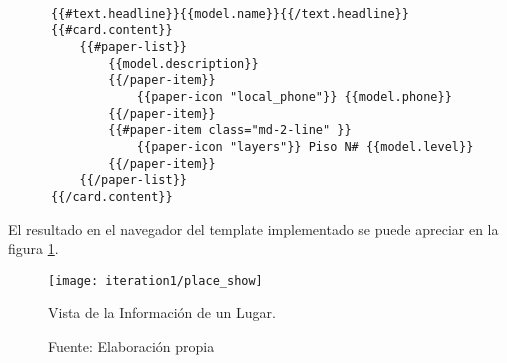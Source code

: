 \newpage
\begin{center}
  \begin{lstlisting}[label=template_places_show,caption=Template para mostrar la información de un lugar]

      {{#text.headline}}{{model.name}}{{/text.headline}}
      {{#card.content}}
          {{#paper-list}}
              {{model.description}}
              {{/paper-item}}
                  {{paper-icon "local_phone"}} {{model.phone}}
              {{/paper-item}}
              {{#paper-item class="md-2-line" }}
                  {{paper-icon "layers"}} Piso N# {{model.level}}
              {{/paper-item}}
          {{/paper-list}}
      {{/card.content}}

  \end{lstlisting}
\end{center}

El resultado en el navegador del template implementado se puede apreciar en la figura \ref{fig:place_show}. \\

\begin{figure}[H]
  \begin{center}
    \texttt{[image: iteration1/place\_show]}
    \caption{Vista de la Información de un Lugar.}
    \label{fig:place_show}
    \caption*{Fuente: Elaboración propia}
  \end{center}
\end{figure}




